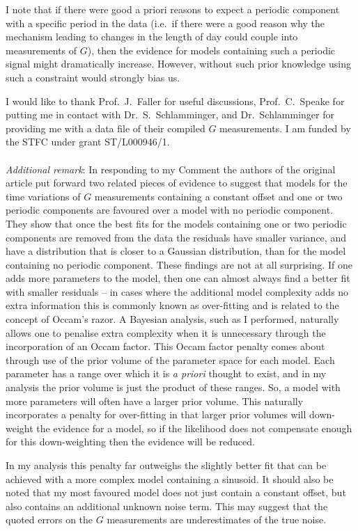 \documentclass[comment]{epl2}
\begin{document}
I note that if there were good a priori reasons to expect a periodic component with a specific period in the data
(i.e.\ if there were a good reason why the mechanism leading to changes in the length of day could couple into 
measurements of
$G$), then the evidence for models containing such a periodic signal might dramatically increase. However, without such
prior knowledge using such a constraint would strongly bias us.

\acknowledgements

I would like to thank Prof.\ J.\ Faller for useful discussions, Prof.\ C.\ Speake for putting me in contact with
Dr.\ S.\ Schlamminger, and Dr.\ Schlamminger for providing me with a data file of their compiled $G$ measurements.
I am funded by the STFC under grant ST/L000946/1.
~\\
~\\
{\it Additional remark}: In responding to my Comment \cite{response} the authors of the original article put forward two related pieces of 
evidence to suggest that models for the time variations of $G$ measurements containing a constant 
offset and one or two periodic components are favoured over a model with no periodic component. 
They show that once the best fits for the models containing one or two periodic components are 
removed from the data the residuals have smaller variance, and have a distribution that is closer 
to a Gaussian distribution, than for the model containing no periodic component. These findings are 
not at all surprising.  If one adds more parameters to the model, then one can almost always find a 
better fit with smaller residuals -- in cases where the additional model complexity adds no extra 
information this is commonly known as over-fitting and is related to the concept of Occam's razor. 
A Bayesian analysis, such as I performed, naturally allows one to penalise extra complexity when it 
is unnecessary through the incorporation of an Occam factor. This Occam factor penalty comes 
about through use of the prior volume of the parameter space for each model. Each parameter has a 
range over which it is {\it a priori} thought to exist, and in my analysis the prior volume is 
just the product of these ranges. So, a model with more parameters will often have a larger prior 
volume. This naturally incorporates a penalty for over-fitting in that larger prior volumes will 
down-weight the evidence for a model, so if the likelihood does not compensate enough for this 
down-weighting then the evidence will be reduced.

In my analysis this penalty far outweighs the slightly better fit that can be achieved with a more 
complex model containing a sinusoid. It should also be noted that my most favoured model does not 
just contain a constant offset, but also contains an additional unknown noise term. This may 
suggest that the quoted errors on the $G$ measurements are underestimates of the true noise.
\end{document}
